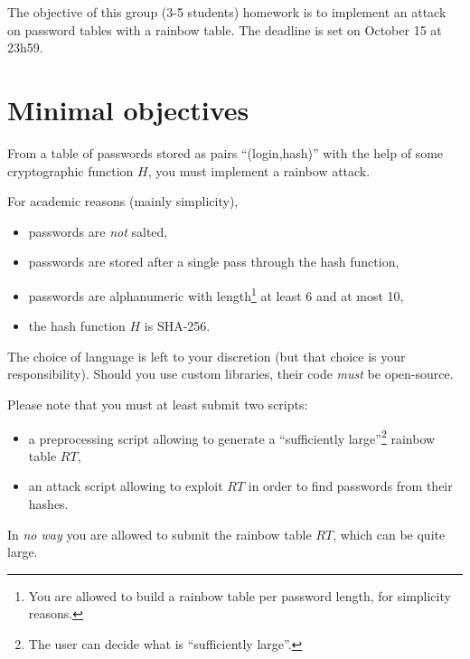 \documentclass[a4paper,11pt]{article}
\author{R. Absil}
\newcommand{\deadline}{October 15 at 23h59}
\begin{document}
\pagestyle{fancy} %

\maketitle

The objective of this group (3-5 students) homework is to implement an attack on password tables with a rainbow table. The deadline is set on \deadline.

\section*{Minimal objectives}

From a table of passwords stored as pairs ``(login,hash)'' with the help of some cryptographic function $H$, you must implement a rainbow attack.

For academic reasons (mainly simplicity),
\begin{itemize}
\item passwords are \emph{not} salted,
\item passwords are stored after a single pass through the hash function,
\item passwords are alphanumeric with length\footnote{You are allowed to build a rainbow table per password length, for simplicity reasons.} at least 6 and at most 10,
\item the hash function $H$ is SHA-256.\\
\end{itemize}

The choice of language is left to your discretion (but that choice is your responsibility). Should you use custom libraries, their code \emph{must} be open-source.

Please note that you must at least submit two scripts:
\begin{itemize}
\item a preprocessing script allowing to generate a ``sufficiently large''\footnote{The user can decide what is ``sufficiently large''.} rainbow table $RT$,
\item an attack script allowing to exploit $RT$ in order to find passwords from their hashes.%
\end{itemize}
In \emph{no way} you are allowed to submit the rainbow table $RT$, which can be quite large.
\end{document}

